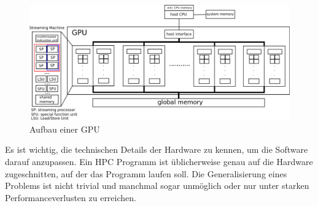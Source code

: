 		\begin{figure}[h]
			\centering
    	        \includegraphics[width=\textwidth]{chapter2/pictures/sm.pdf}
    	        \caption[GPU]{Aufbau einer GPU}
    		    \label{2:gpu}
		\end{figure}

		Es ist wichtig, die technischen Details der Hardware zu kennen, um die Software darauf anzupassen. Ein HPC Programm ist üblicherweise genau auf die Hardware zugeschnitten, auf der das Programm laufen soll. Die Generalisierung eines Problems ist nicht trivial und manchmal sogar unmöglich oder nur unter starken \Gls{Performance}verlusten zu erreichen.	